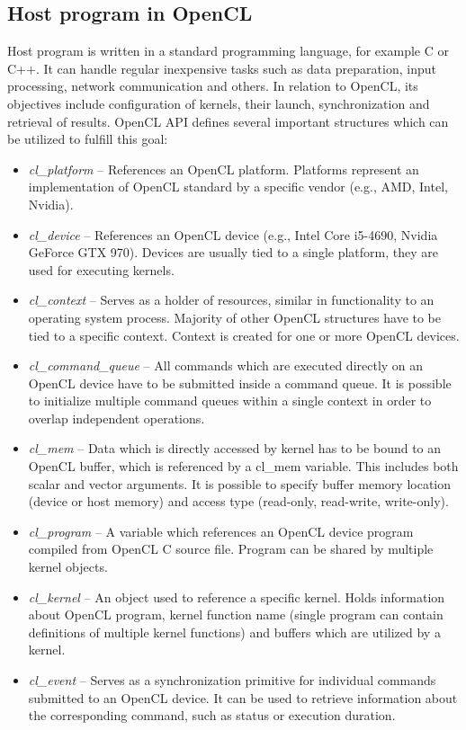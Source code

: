 \documentclass
[
    digital, %
    oneside, %
    table, %
    nolof, %
    nolot, %
    nocover %
]{fithesis3}
\begin{document}
\subsection{Host program in OpenCL}
Host program is written in a standard programming language, for example C or C++. It can handle regular inexpensive tasks such as data preparation,
input processing, network communication and others. In relation to OpenCL, its objectives include configuration of kernels, their launch,
synchronization and retrieval of results. OpenCL API defines several important structures which can be utilized to fulfill this goal:
\begin{itemize}
    \item \textit{cl\_platform} -- References an OpenCL platform. Platforms represent an implementation of OpenCL standard by a specific vendor
    (e.g., AMD, Intel, Nvidia). 
    \item \textit{cl\_device} -- References an OpenCL device (e.g., Intel Core i5-4690, Nvidia GeForce GTX 970). Devices are usually tied to a single
    platform, they are used for executing kernels.
    \item \textit{cl\_context} -- Serves as a holder of resources, similar in functionality to an operating system process. Majority of other OpenCL
    structures have to be tied to a specific context. Context is created for one or more OpenCL devices.
    \item \textit{cl\_command\_queue} -- All commands which are executed directly on an OpenCL device have to be submitted inside a command queue. It
    is possible to initialize multiple command queues within a single context in order to overlap independent operations.
    \item \textit{cl\_mem} -- Data which is directly accessed by kernel has to be bound to an OpenCL buffer, which is referenced by a cl\_mem variable.
    This includes both scalar and vector arguments. It is possible to specify buffer memory location (device or host memory) and access type (read-only,
    read-write, write-only).
    \item \textit{cl\_program} -- A variable which references an OpenCL device program compiled from OpenCL C source file. Program can be shared by
    multiple kernel objects.
    \item \textit{cl\_kernel} -- An object used to reference a specific kernel. Holds information about OpenCL program, kernel function name (single
    program can contain definitions of multiple kernel functions) and buffers which are utilized by a kernel.
    \item \textit{cl\_event} -- Serves as a synchronization primitive for individual commands submitted to an OpenCL device. It can be used to retrieve
    information about the corresponding command, such as status or execution duration.
\end{itemize}
\end{document}
